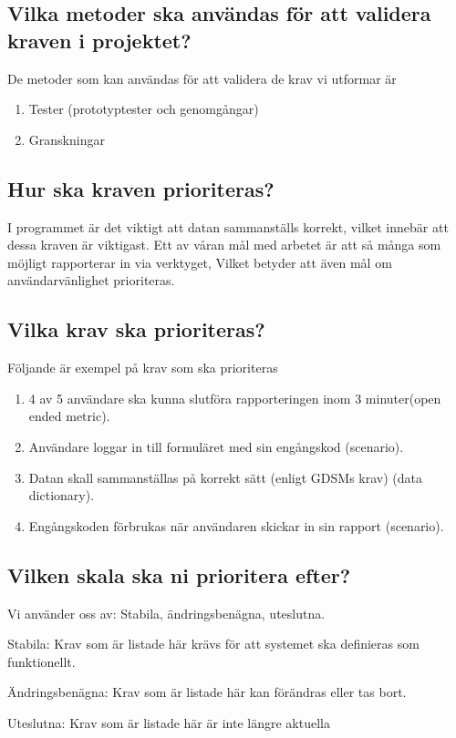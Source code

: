 \documentclass[12pt]{article}
\begin{document}
\subsection{Vilka metoder ska användas för att validera kraven i projektet?}

De metoder som kan användas för att validera de krav vi utformar är
\begin{enumerate}
    \item Tester (prototyptester och genomgångar)
    \item Granskningar
\end{enumerate}

\subsection{Hur ska kraven prioriteras?}
I programmet är det viktigt att datan sammanställs korrekt, vilket innebär att dessa kraven är viktigast. Ett av våran mål med arbetet är att så många som möjligt rapporterar in via verktyget, Vilket betyder att även mål om användarvänlighet prioriteras. 

\subsection{Vilka krav ska prioriteras?}
Följande är exempel på krav som ska prioriteras
\begin{enumerate}
    \item 4 av 5 användare ska kunna slutföra rapporteringen inom 3 minuter(open ended metric).
    \item Användare loggar in till formuläret med sin engångskod (scenario).
    \item Datan skall sammanställas på korrekt sätt (enligt GDSMs krav) (data dictionary).
    \item Engångskoden förbrukas när användaren skickar in sin rapport (scenario).
\end{enumerate}
\subsection{Vilken skala ska ni prioritera efter?}
Vi använder oss av: Stabila, ändringsbenägna, uteslutna.
	\item Stabila: Krav som är listade här krävs för att systemet ska definieras som funktionellt.
	\item Ändringsbenägna: Krav som är listade här kan förändras eller tas bort.
	\item Uteslutna: Krav som är listade här är inte längre aktuella
	
\end{document}
